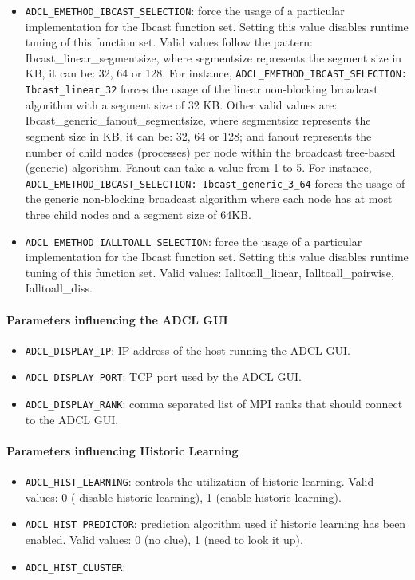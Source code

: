\begin{itemize}
\item{\tt ADCL\_EMETHOD\_IBCAST\_SELECTION}: force the usage of a particular
  implementation for the Ibcast function set. Setting this value
  disables runtime tuning of this function set. Valid values follow the pattern: Ibcast\_linear\_segmentsize, where segmentsize represents the segment size in KB, it can be: 32, 64 or 128. For instance, {\tt ADCL\_EMETHOD\_IBCAST\_SELECTION: Ibcast\_linear\_32} forces the usage of the linear non-blocking broadcast algorithm with a segment size of 32 KB. Other valid values are: Ibcast\_generic\_fanout\_segmentsize, where segmentsize represents the segment size in KB, it can be: 32, 64 or 128; and fanout represents the number of child nodes (processes) per node within the broadcast tree-based (generic) algorithm. Fanout can take a value from 1 to 5. For instance, {\tt ADCL\_EMETHOD\_IBCAST\_SELECTION: Ibcast\_generic\_3\_64} forces the usage of the generic non-blocking broadcast algorithm where each node has at most three child nodes and a segment size of 64KB.
\item{\tt ADCL\_EMETHOD\_IALLTOALL\_SELECTION}: force the usage of a particular
  implementation for the Ibcast function set. Setting this value
  disables runtime tuning of this function set. Valid values: Ialltoall\_linear, Ialltoall\_pairwise, Ialltoall\_diss.
\end{itemize}


\paragraph{Parameters influencing the ADCL GUI}
\begin{itemize}
\item {\tt ADCL\_DISPLAY\_IP}: IP address of the host running the ADCL GUI.
\item{\tt ADCL\_DISPLAY\_PORT}: TCP port used by the ADCL GUI.
\item{\tt ADCL\_DISPLAY\_RANK}: comma separated list of MPI ranks that should connect to the
  ADCL GUI. 
\end{itemize}
  

\paragraph{Parameters influencing Historic Learning}
\begin{itemize}
\item{\tt ADCL\_HIST\_LEARNING}: controls the utilization of historic
  learning. Valid values: 0 ( disable historic learning), 1 (enable historic
  learning).

\item{\tt ADCL\_HIST\_PREDICTOR}: prediction algorithm used if historic
  learning has been enabled. Valid values: 0 (no clue), 1 (need to look it
  up).
\item{\tt ADCL\_HIST\_CLUSTER}:
\end{itemize}
